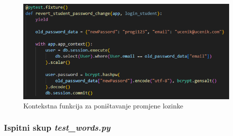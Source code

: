 \begin{figure}[htp]
	\includegraphics[scale=0.9]{slike/fixture_pwd.png}
	\centering
	\caption{Kontekstna funkcija za poništavanje promjene lozinke}
	\label{fig:test-7}
\end{figure}

\eject
\pagebreak

\subsubsection{Ispitni skup \emph{test\_words.py}}

